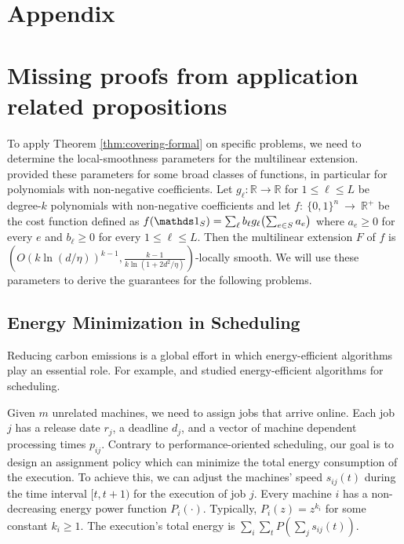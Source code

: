 
\section*{Appendix}

\section{Missing proofs from application related propositions} \label{sec:appix-proofs}
To apply Theorem \ref{thm:covering-formal} on specific problems, we need to determine the local-smoothness parameters for the multilinear extension.
\cite{Thang20:Online-Primal-Dual} provided these parameters for some broad classes of functions, in particular for polynomials with non-negative coefficients. Let $g_{\ell}: \mathbb{R} \rightarrow \mathbb{R}$ for $1 \leq \ell \leq L$
be degree-$k$ polynomials with non-negative coefficients and let $f:~\{0,1\}^{n}~\rightarrow~\mathbb{R}^{+}$ be the cost function
defined as $f(\one_{S}) = \sum_{\ell} b_{\ell} g_{\ell}\bigl( \sum_{e \in S} a_{e} \bigr)$ where $a_{e} \geq 0$ for every
$e$ and $b_{\ell} \geq 0$ for every $1 \leq \ell \leq L$.
Then the multilinear extension $F$ of $f$ is $(O(k \ln(d/\eta))^{k-1}, \frac{k-1}{k \ln(1 + 2d^{2}/\eta)})$-locally smooth.
We will use these parameters to derive the guarantees for the following problems.




\subsection{Energy Minimization in Scheduling}

Reducing carbon emissions is a global effort in which energy-efficient algorithms play an essential role. For example, \cite{Albers10:Energy-efficient-algorithms} and \cite{GuCaiZengZhangJinDai:2019} studied energy-efficient algorithms for scheduling.

Given $m$ unrelated machines, we need to assign jobs that arrive online. Each job $j$ has a release date $r_{j}$, a deadline $d_{j}$, and a vector of machine dependent processing times $p_{ij}$. Contrary to performance-oriented scheduling, our goal is to design an assignment policy which can minimize the total energy consumption of the execution. To achieve this, we can adjust the machines' speed $s_{ij}(t)$ during the time interval $[t,t+1)$ for the execution of job $j$. Every machine $i$ has a non-decreasing energy power function $P_{i}(\cdot)$. Typically, $P_{i}(z) = z^{k_{i}}$ for some constant $k_{i} \geq 1$. The execution's total energy is $\sum_{i} \sum_{t} P(\sum_{j} s_{ij}(t))$.

